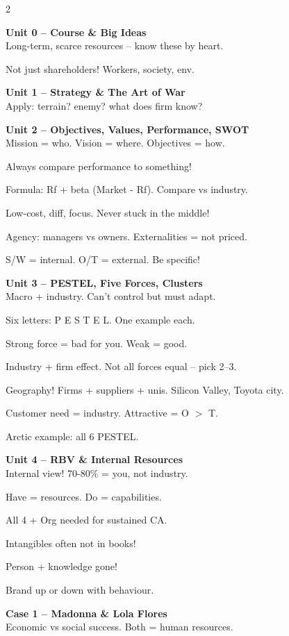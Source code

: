 \documentclass[8pt,landscape,a4paper]{article}
\begin{document}
\newpage
\vspace*{0.3em}
\noindent\color{noteblue}
\setlength{\parskip}{0.3em}
\begin{multicols}{2}

\textbf{Unit 0 -- Course \& Big Ideas}\\
Long-term, scarce resources -- know these by heart.

Not just shareholders! Workers, society, env.

\textbf{Unit 1 -- Strategy \& The Art of War}\\
Apply: terrain? enemy? what does firm know?

\textbf{Unit 2 -- Objectives, Values, Performance, SWOT}\\
Mission = who. Vision = where. Objectives = how.

Always compare performance to something!

Formula: Rf + beta (Market - Rf). Compare vs industry.

Low-cost, diff, focus. Never stuck in the middle!

Agency: managers vs owners. Externalities = not priced.

S/W = internal. O/T = external. Be specific!

\textbf{Unit 3 -- PESTEL, Five Forces, Clusters}\\
Macro + industry. Can't control but must adapt.

Six letters: P E S T E L. One example each.

Strong force = bad for you. Weak = good.

Industry + firm effect. Not all forces equal -- pick 2--3.

Geography! Firms + suppliers + unis. Silicon Valley, Toyota city.

Customer need = industry. Attractive = O $>$ T.

Arctic example: all 6 PESTEL.

\textbf{Unit 4 -- RBV \& Internal Resources}\\
Internal view! 70-80\% = you, not industry.

Have = resources. Do = capabilities.

All 4 + Org needed for sustained CA.

Intangibles often not in books!

Person + knowledge gone!

Brand up or down with behaviour.

\textbf{Case 1 -- Madonna \& Lola Flores}\\
Economic vs social success. Both = human resources.


\end{multicols}
\end{document}

